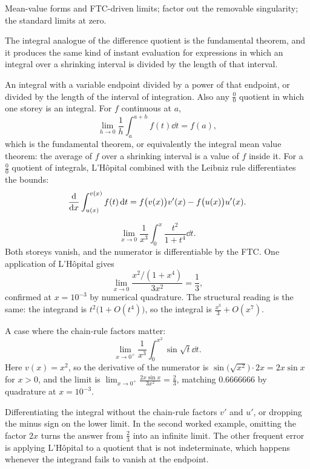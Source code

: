\begin{seealsob}Mean-value forms and FTC-driven limits; factor out the removable singularity; the standard limits at zero.\end{seealsob}

The integral analogue of the difference quotient is the fundamental theorem, and it produces the same kind of instant evaluation for expressions in which an integral over a shrinking interval is divided by the length of that interval.

\cue An integral with a variable endpoint divided by a power of that endpoint, or divided by the length of the interval of integration. Also any $\tfrac00$ quotient in which one storey is an integral.
\method For $f$ continuous at $a$,
\[\lim_{h\to0}\frac1h\int_{a}^{a+h}f(t)\dd t=f(a),\]
which is the fundamental theorem, or equivalently the integral mean value theorem: the average of $f$ over a shrinking interval is a value of $f$ inside it. For a $\tfrac00$ quotient of integrals, L'H\^opital combined with the Leibniz rule differentiates the bounds:
\[\frac{\mathrm{d}}{\mathrm{d}x}\int_{u(x)}^{v(x)}f(t)\,\mathrm{d} t=f\bigl(v(x)\bigr)v'(x)-f\bigl(u(x)\bigr)u'(x).\]

\begin{worked}
\[\lim_{x\to0}\frac{1}{x^{3}}\int_{0}^{x}\frac{t^{2}}{1+t^{4}}\dd t.\]
Both storeys vanish, and the numerator is differentiable by the FTC. One application of L'H\^opital gives
\[\lim_{x\to0}\frac{x^{2}/(1+x^{4})}{3x^{2}}=\frac13 ,\]
confirmed at $x=10^{-3}$ by numerical quadrature. The structural reading is the same: the integrand is $t^{2}\bigl(1+O(t^{4})\bigr)$, so the integral is $\tfrac{x^{3}}{3}+O(x^{7})$.

A case where the chain-rule factors matter:
\[\lim_{x\to0^{+}}\frac{1}{x^{3}}\int_{0}^{x^{2}}\sin\sqrt{t}\dd t .\]
Here $v(x)=x^{2}$, so the derivative of the numerator is $\sin\bigl(\sqrt{x^{2}}\bigr)\cdot 2x=2x\sin x$ for $x>0$, and the limit is $\displaystyle\lim_{x\to0^{+}}\frac{2x\sin x}{3x^{2}}=\frac23$, matching $0.6666666$ by quadrature at $x=10^{-3}$.
\end{worked}

\begin{trap}
Differentiating the integral without the chain-rule factors $v'$ and $u'$, or dropping the minus sign on the lower limit. In the second worked example, omitting the factor $2x$ turns the answer from $\tfrac23$ into an infinite limit. The other frequent error is applying L'H\^opital to a quotient that is not indeterminate, which happens whenever the integrand fails to vanish at the endpoint.
\end{trap}

